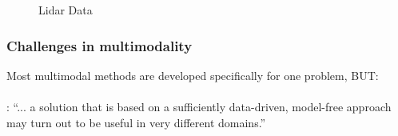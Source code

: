 \documentclass{beamer}
\begin{document}
\begin{frame}
\begin{figure}
\begin{minipage}[b]{0.40\linewidth}
      \caption{Lidar Data}
    \end{minipage}
    \hfill
  \end{figure}
\end{frame}


\begin{frame}
  \frametitle{Challenges in multimodality}
  Most multimodal methods are developed specifically for one problem, BUT: \\~\\
  \cite{Lahat2015}: ``... a solution that is based on a sufficiently data-driven, model-free approach may turn out to be useful in very different domains.''
\end{frame}

\end{document}
